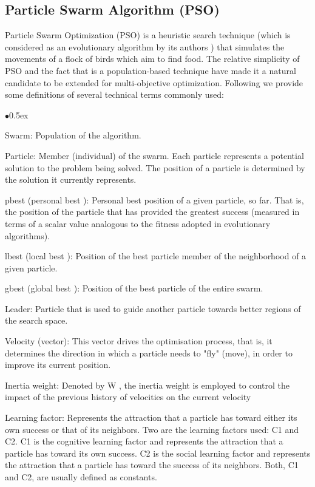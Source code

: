 \documentclass[12pt, runningheads,a4paper]{llncs}
\begin{document}
\subsection{Particle Swarm Algorithm (PSO)}
Particle Swarm Optimization (PSO) is a heuristic search technique (which is considered as an evolutionary algorithm by its authors \cite{pso1998}) that simulates the movements of a flock of birds which aim to find food. The relative simplicity of PSO and the fact that is a population-based technique have made it a natural candidate to be extended for multi-objective optimization.
Following we provide some definitions of several technical terms commonly used:
\begin{list}{$\bullet$}{\itemsep 0.5ex}

\item Swarm:  Population of the algorithm.

\item Particle:  Member (individual) of the swarm. Each particle represents a potential solution to the problem being solved. The position of a particle is determined by the solution it currently represents.

\item pbest  (personal best ):  Personal best position of a given particle, so far. That is, the position of the particle that has provided the greatest success (measured in terms of a scalar value analogous to the fitness adopted in evolutionary algorithms).

\item lbest  (local best ):  Position of the best particle member of the neighborhood of a given particle.

\item gbest  (global best ):  Position of the best particle of the entire swarm.
\item Leader:  Particle that is used to guide another particle towards better regions of the search space.

\item Velocity (vector):  This vector drives the optimisation process, that is, it determines the direction in which a particle needs to "fly" (move), in order to improve its current position.
\item Inertia weight:  Denoted by W , the inertia weight is employed to control the impact of the previous history of velocities on the current velocity
\item Learning factor: Represents the attraction that a particle has toward either its own success or that of its neighbors. Two are the learning factors used: C1 and C2. C1 is the cognitive learning factor and represents the attraction that a particle has toward its own success. C2 is the social learning factor and represents the attraction that a particle has toward the success of its neighbors. Both, C1 and C2, are usually defined as constants.


\end{list}
\end{document}
